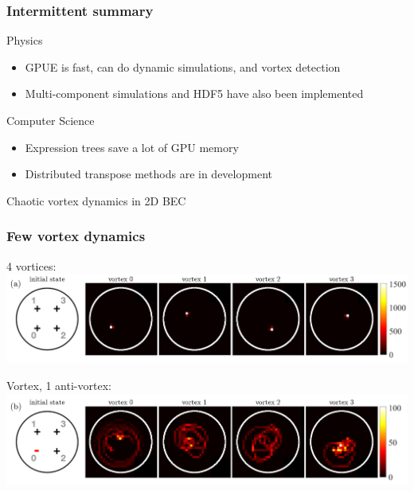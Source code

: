 \documentclass{beamer}
\begin{document}
\begin{frame}
\frametitle{Intermittent summary}

Physics
\begin{itemize}
\item GPUE is fast, can do dynamic simulations, and vortex detection
\item Multi-component simulations and HDF5 have also been implemented
\end{itemize}

\vspace{0.5cm}
\pause

Computer Science
\begin{itemize}
\item Expression trees save a lot of GPU memory
\item Distributed transpose methods are in development
\end{itemize}
\end{frame}

\begin{frame}
\center \huge Chaotic vortex dynamics in 2D BEC
\end{frame}

\begin{frame}
\frametitle{Few vortex dynamics}

4 vortices:
\includegraphics[width=\textwidth]{histogram_1}

 Vortex, 1 anti-vortex:
\includegraphics[width=\textwidth]{histogram_2}


\end{frame}
\end{document}
